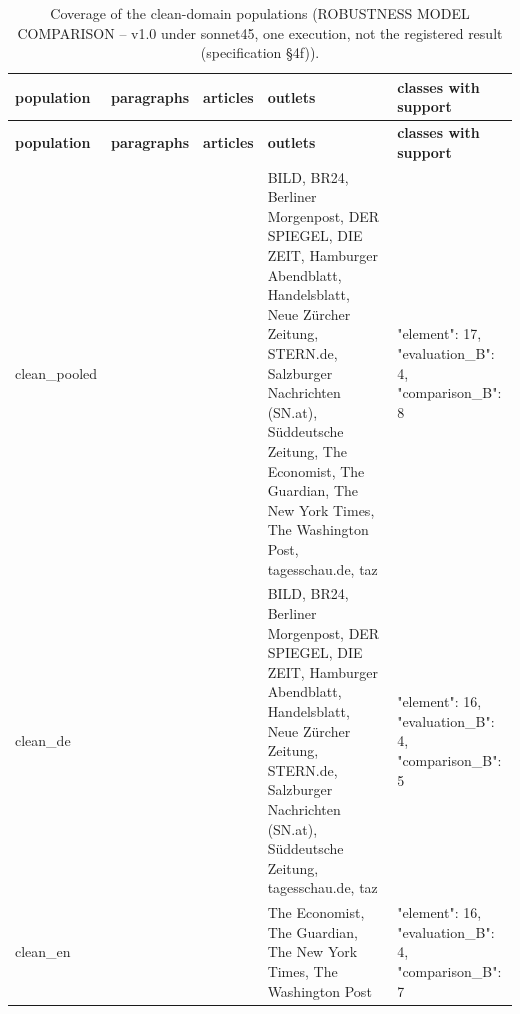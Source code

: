\begingroup\footnotesize
\begin{longtable}{>{\raggedright\arraybackslash}p{66.8pt}>{\raggedright\arraybackslash}p{65.6pt}>{\raggedright\arraybackslash}p{52.9pt}>{\raggedright\arraybackslash}p{120.6pt}>{\raggedright\arraybackslash}p{89.2pt}}
\caption{Coverage of the clean-domain populations (ROBUSTNESS MODEL COMPARISON -- v1.0 under sonnet45, one execution, not the registered result (specification §4f)).} \\
\toprule
\textbf{population} & \textbf{paragraphs} & \textbf{articles} & \textbf{outlets} & \textbf{classes with support} \\
\midrule
\endfirsthead
\toprule
\textbf{population} & \textbf{paragraphs} & \textbf{articles} & \textbf{outlets} & \textbf{classes with support} \\
\midrule
\endhead
\bottomrule
\endfoot
clean\_\allowbreak{}pooled & 105 & 50 & BILD, BR24, Berliner Morgenpost, DER SPIEGEL, DIE ZEIT, Hamburger Abendblatt, Handelsblatt, Neue Zürcher Zeitung, STERN.de, Salzburger Nachrichten (SN.at), Süddeutsche Zeitung, The Economist, The Guardian, The New York Times, The Washington Post, tagesschau.de, taz & {"element":\allowbreak{} 17, "evaluation\_\allowbreak{}B":\allowbreak{} 4, "comparison\_\allowbreak{}B":\allowbreak{} 8} \\
clean\_\allowbreak{}de & 49 & 24 & BILD, BR24, Berliner Morgenpost, DER SPIEGEL, DIE ZEIT, Hamburger Abendblatt, Handelsblatt, Neue Zürcher Zeitung, STERN.de, Salzburger Nachrichten (SN.at), Süddeutsche Zeitung, tagesschau.de, taz & {"element":\allowbreak{} 16, "evaluation\_\allowbreak{}B":\allowbreak{} 4, "comparison\_\allowbreak{}B":\allowbreak{} 5} \\
clean\_\allowbreak{}en & 56 & 26 & The Economist, The Guardian, The New York Times, The Washington Post & {"element":\allowbreak{} 16, "evaluation\_\allowbreak{}B":\allowbreak{} 4, "comparison\_\allowbreak{}B":\allowbreak{} 7} \\
\end{longtable}
\endgroup
